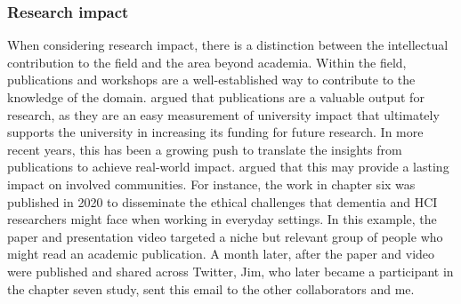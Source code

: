 \subsubsection{Research impact}
When considering research impact, there is a distinction between the intellectual contribution to the field and the area beyond academia. Within the field, publications and workshops are a well-established way to contribute to the knowledge of the domain. \cite{knight2022rather} argued that publications are a valuable output for research, as they are an easy measurement of university impact that ultimately supports the university in increasing its funding for future research. In more recent years, this has been a growing push to translate the insights from publications to achieve real-world impact. \cite{moore2022translating} argued that this may provide a lasting impact on involved communities. For instance, the work in chapter six was published in 2020 to disseminate the ethical challenges that dementia and HCI researchers might face when working in everyday settings. In this example, the paper and presentation video targeted a niche but relevant group of people who might read an academic publication. A month later, after the paper and video were published and shared across Twitter, Jim, who later became a participant in the chapter seven study, sent this email to the other collaborators and me.

